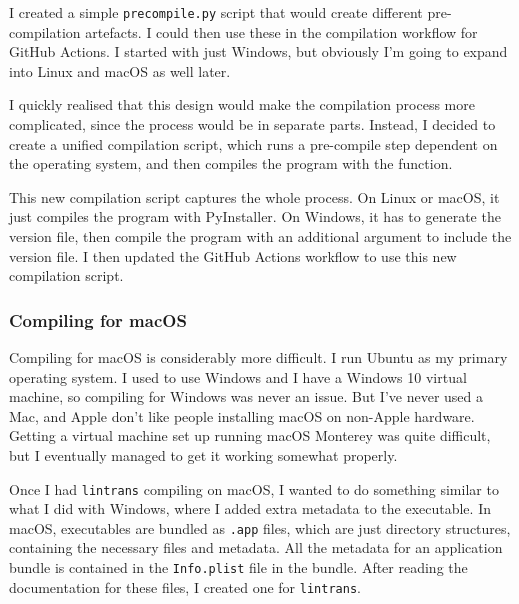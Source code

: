 \documentclass[../development.tex]{subfiles}
\begin{document}
I created a simple \texttt{precompile.py} script that would create different pre-compilation artefacts. I could then use these in the compilation workflow for GitHub Actions. I started with just Windows, but obviously I'm going to expand into Linux and macOS as well later.



I quickly realised that this design would make the compilation process more complicated, since the process would be in separate parts. Instead, I decided to create a unified compilation script, which runs a pre-compile step dependent on the operating system, and then compiles the program with the  function.


This new compilation script captures the whole process. On Linux or macOS, it just compiles the program with PyInstaller. On Windows, it has to generate the version file, then compile the program with an additional argument to include the version file. I then updated the GitHub Actions workflow to use this new compilation script.


\subsubsection{Compiling for macOS\label{development:preparing-for-v0.2.1:compiling-for-macos}}

Compiling for macOS is considerably more difficult. I run Ubuntu as my primary operating system. I used to use Windows and I have a Windows 10 virtual machine, so compiling for Windows was never an issue. But I've never used a Mac, and Apple don't like people installing macOS on non-Apple hardware. Getting a virtual machine set up running macOS Monterey was quite difficult, but I eventually managed to get it working somewhat properly.

Once I had \texttt{lintrans} compiling on macOS, I wanted to do something similar to what I did with Windows, where I added extra metadata to the executable. In macOS, executables are bundled as \texttt{.app} files, which are just directory structures, containing the necessary files and metadata\cite{apple-bundle-structures}. All the metadata for an application bundle is contained in the \texttt{Info.plist} file in the bundle\cite{apple-about-info.plist-files}\cite{apple-about-info.plist-keys-and-values}. After reading the documentation for these files, I created one for \texttt{lintrans}.
\end{document}
